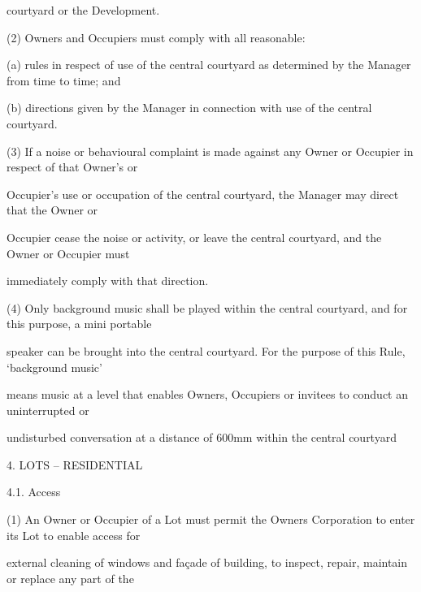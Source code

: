 \documentclass{article}
\begin{document}
{\fontsize{10.02}{1}courtyard or the Development.  }

\newpage


















{\fontsize{9.962}{1}(2) Owners and Occupiers must comply with all reasonable: }

{\fontsize{9.962}{1}(a) rules in respect of use of the central courtyard as determined by the Manager from time to time; and }

{\fontsize{9.962}{1}(b) directions given by the Manager in connection with use of the central courtyard. }

{\fontsize{9.962}{1}(3) If a noise or behavioural complaint is made against any Owner or Occupier in respect of that Owner’s or }

{\fontsize{10.02}{1}Occupier’s use or occupation of the central courtyard, the Manager may direct that the Owner or }

{\fontsize{10.02}{1}Occupier cease the noise or activity, or leave the central courtyard, and the Owner or Occupier must }

{\fontsize{10.02}{1}immediately comply with that direction. }

{\fontsize{9.962}{1}(4) Only background music shall be played within the central courtyard, and for this purpose, a mini portable }

{\fontsize{10.02}{1}speaker can be brought into the central courtyard. For the purpose of this Rule, ‘background music’ }

{\fontsize{10.02}{1}means music at a level that enables Owners, Occupiers or invitees to conduct an uninterrupted or }

{\fontsize{10.02}{1}undisturbed conversation at a distance of 600mm within the central courtyard  }


{\fontsize{9.99}{1}4. LOTS – RESIDENTIAL }

{\fontsize{9.99}{1}4.1. Access }

{\fontsize{9.962}{1}(1) An Owner or Occupier of a Lot must permit the Owners Corporation to enter its Lot to enable access for }

{\fontsize{10.02}{1}external cleaning of windows and façade of building, to inspect, repair, maintain or replace any part of the }
\end{document}
